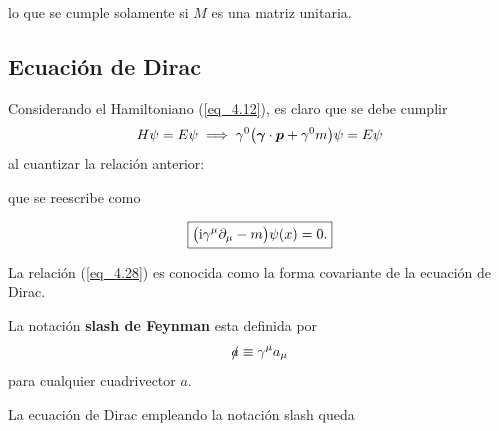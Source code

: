 
lo que se cumple solamente si $M$ es una matriz unitaria.

\subsection{Ecuación de Dirac}
Considerando el Hamiltoniano (\ref{eq_4.12}), es claro que se debe cumplir 
\begin{equation*}
	H\psi = E \psi \implies \gamma^0\qty( \vb*{\gamma}\cdot \vb*{p} + \gamma^0 m ) \psi = E \psi 
\end{equation*}
al cuantizar la relación anterior:


que se reescribe como 

\begin{equation}
	\boxed{ \qty\big( \mathrm{i}\gamma^\mu \partial_\mu -m )\psi(x)  =0. }
	\label{eq_4.28}
\end{equation}

La relación (\ref{eq_4.28}) es conocida como la forma covariante de la ecuación de Dirac.

\begin{definition}
	La notación \textbf{slash de Feynman} esta definida por
	\begin{equation}
		\slashed{a} \equiv  \gamma^\mu a_\mu 
	\end{equation}
	para cualquier cuadrivector $a$.
\end{definition}
 La ecuación de Dirac empleando la notación slash queda
 
